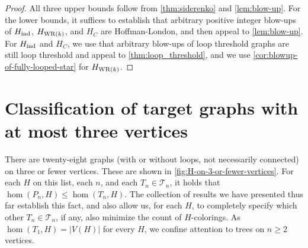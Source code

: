 \documentclass[11pt]{article}
\theoremstyle{definition}
\begin{document}
\begin{proof}
All three upper bounds follow from \cref{thm:siderenko} and \cref{lem:blow-up}. For the lower bounds, it suffices to establish that arbitrary positive integer blow-ups of $H_{\rm ind}$, $H_{{\rm WR}(k)}$, and $H_C$ are Hoffman-London, and then appeal to \cref{lem:blow-up}. For $H_{\rm ind}$ and $H_C$, we use that arbitrary blow-ups of loop threshold graphs are still loop threshold and appeal to \cref{thm:loop_threshold}, and we use \cref{cor:blowup-of-fully-looped-star} for $H_{{\rm WR}(k)}$. 
\end{proof}


\section{Classification of target graphs with at most three vertices} \label{sec:constraint-3-vertices}

There are twenty-eight graphs (with or without loops, not necessarily connected) on three or fewer vertices. These are shown in \cref{fig:H-on-3-or-fewer-vertices}. For each $H$ on this list, each $n$, and each $T_n \in {\mathcal T}_n$, it holds that $\hom(P_n, H) \le \hom(T_n,H)$. The collection of results we have presented thus far establish this fact, and also allow us, for each $H$, to completely specify which other $T_n \in {\mathcal T}_n$, if any, also minimize the count of $H$-colorings. As $\hom(T_1,H)=|V(H)|$ for every $H$, we confine attention to trees on $n \ge 2$ vertices.
\end{document}
